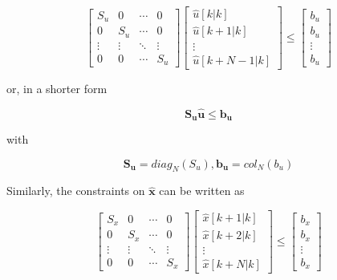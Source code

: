 \noindent
\begin{equation}
	\left[
		\begin{matrix}
			S_u & 0 & \cdots & 0 \\
			0 & S_u & \cdots & 0 \\
			\vdots & \vdots & \ddots & \vdots \\
			0 & 0 & \cdots & S_u
		\end{matrix}
	\right]
	\left[
		\begin{matrix}
			\hat{u}[k | k] \\
			\hat{u}[k + 1 | k] \\
			\vdots \\
			\hat{u}[k + N-1 | k]
		\end{matrix}
	\right]
	\leq
	\left[
		\begin{matrix}
			b_u \\
			b_u \\
			\vdots \\
			b_u
		\end{matrix}
	\right]
\end{equation}

\noindent
or, in a shorter form

\noindent
\begin{equation}
	\mathbf{S_u \hat{u}} \leq \mathbf{b_u}
\end{equation}

\noindent
with

\noindent
\begin{equation}
	\mathbf{S_u} = diag_N(S_u), \mathbf{b_u} = col_N(b_u)
\end{equation}

Similarly, the constraints on $\mathbf{\hat{x}}$ can be written as

\begin{equation}
	\left[
		\begin{matrix}
			S_x & 0 & \cdots & 0 \\
			0 & S_x & \cdots & 0 \\
			\vdots & \vdots & \ddots & \vdots \\
			0 & 0 & \cdots & S_x
		\end{matrix}
	\right]
	\left[
		\begin{matrix}
			\hat{x}[k + 1 | k] \\
			\hat{x}[k + 2 | k] \\
			\vdots \\
			\hat{x}[k + N | k]
		\end{matrix}
	\right]
	\leq
	\left[
		\begin{matrix}
			b_x \\
			b_x \\
			\vdots \\
			b_x
		\end{matrix}
	\right]
\end{equation}

